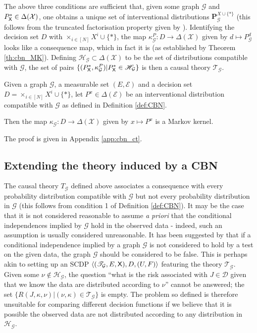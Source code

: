 The above three conditions are sufficient that, given some graph $\mathcal{G}$ and $P^*_{\mathsf{X}}\in \Delta(\mathcal{X})$, one obtains a unique set of interventional distributions $\mathbf{P}_{\mathcal{G}}^{X\cup\{*\}}$ (this follows from the truncated factorisation property given by \cite{pearl_causality:_2009}). Identifying the decision set $D$ with $\times_{i\in [N]} X^i\cup\{*\}$, the map $\kappa^P_\mathcal{G}:D\to \Delta(\mathcal{X})$ given by $d\mapsto P^d_{\mathcal{G}}$ looks like a consequence map, which in fact it is (as established by Theorem \ref{th:cbn_MK}). Defining $\mathscr{H}_{\mathcal{G}}\subset\Delta(\mathcal{X})$ to be the set of distributions compatible with $\mathcal{G}$, the set of pairs $\{(P^*_{\mathsf{X}}, \kappa^P_\mathcal{G})|P^*_{\mathsf{X}}\in \mathscr{H}_{\mathcal{G}}\}$ is then a causal theory $\mathscr{T}_\mathcal{G}$.

\begin{theorem}\label{th:cbn_MK}
Given a graph $\mathcal{G}$, a measurable set $(E,\mathcal{E})$ and a decision set $D=\times_{i\in [N]} X^i\cup\{*\}$, let $P^x\in \Delta(\mathcal{E})$ be an interventional distribution compatible with $\mathcal{G}$ as defined in Definition \ref{def:CBN}. 

Then the map $\kappa_{\mathcal{G}}:D\to \Delta(\mathcal{X})$ given by $x\mapsto P^x$ is a Markov kernel.
\end{theorem}

The proof is given in Appendix \ref{app:cbn_ct}.

\subsection{Extending the theory induced by a CBN}

The causal theory $T_{\mathcal{G}}$ defined above associates a consequence with every probability distribution compatible with $\mathcal{G}$ but not every probability distribution in $\mathcal{G}$ (this follows from condition 1 of Definition \ref{def:CBN}). It may be the case that it is not considered reasonable to assume \emph{a priori} that the conditional independences implied by $\mathcal{G}$ hold in the observed data - indeed, such an assumption is usually considered unreasonable. It has been suggested by \cite{pearl_causality:_2009} that if a conditional independence implied by a graph $\mathcal{G}$ is not considered to hold by a test on the given data, the graph $\mathcal{G}$ should be considered to be false. This is perhaps akin to setting up an SCDP $\langle (\mathscr{T}_{\mathcal{G}},E,\mathsf{X}),D,(U,F)\rangle$ featuring the theory $\mathscr{T}_{\mathcal{G}}$. Given some $\nu\not\in \mathscr{H}_{\mathcal{G}}$, the question ``what is the risk associated with $J\in\mathscr{D}$ given that we know the data are distributed according to $\nu$'' cannot be answered; the set $\{R(J,\kappa,\nu)|(\nu,\kappa)\in\mathscr{T}_{\mathcal{G}}\}$ is empty. The problem so defined is therefore unsuitable for comparing different decision functions if we believe that it is possible the observed data are not distributed according to any distribution in $\mathscr{H}_{\mathcal{G}}$.

